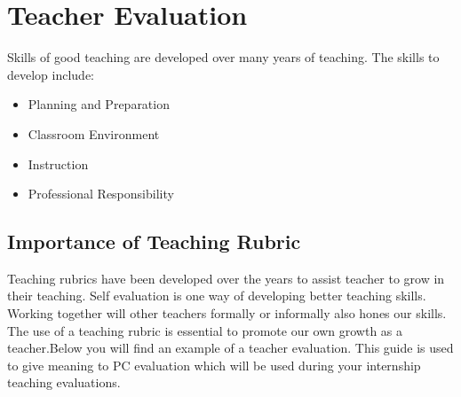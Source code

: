 \section{Teacher Evaluation}
Skills of good teaching are developed over many years of teaching. The skills to develop include:
\begin{itemize}
\item Planning and Preparation
\item Classroom Environment
\item Instruction
\item Professional Responsibility
\end{itemize}

\subsection{Importance of Teaching Rubric}
Teaching rubrics have been developed over the years to assist teacher to grow in their teaching.  Self evaluation is one way of developing better teaching skills. Working together will other teachers formally or informally also hones our skills.  The use of a teaching rubric is essential to promote our own growth as a teacher.Below you will find an example of a teacher evaluation.  This guide is used to give meaning to PC evaluation which will be used during your internship teaching evaluations.  


